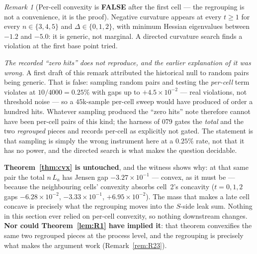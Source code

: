 \documentclass[11pt]{article}
\theoremstyle{definition}
\theoremstyle{remark}
\newtheorem{remark}{Remark}
\begin{document}
\begin{remark}[Per-cell convexity is \textbf{FALSE} after the first cell
--- the regrouping is not a convenience, it is the proof]
Negative curvature appears at every $t\ge1$ for every
$n\in\{3,4,5\}$ and $\Delta\in\{0,1,2\}$, with minimum Hessian eigenvalues
between $-1.2$ and $-5.0$: it is generic, not marginal. A directed
curvature search finds a violation at the first base point tried.

\emph{The recorded ``zero hits'' does not reproduce, and the earlier
explanation of it was wrong.} A first draft of this remark attributed the
historical null to random pairs being generic. That is false: sampling
random pairs and testing the \emph{per-cell} term violates at
$10/4000=0.25\%$ with gaps up to $+4.5\times10^{-2}$ --- real violations, not
threshold noise --- so a $45$k-sample per-cell sweep would have produced of
order a hundred hits. Whatever sampling produced the ``zero hits'' note
therefore cannot have been per-cell pairs of this kind; the harness of 079
gates the \emph{total} and the two \emph{regrouped} pieces and records
per-cell as explicitly not gated. The statement is that sampling is
simply the wrong instrument here at a $0.25\%$ rate, not that it has no
power, and the directed search is what makes the question decidable.

\textbf{Theorem~\ref{thm:cvx} is untouched}, and the witness shows why: at
that same pair the total $n\,L_a$ has Jensen gap $-3.27\times10^{-1}$
--- convex, as it must be --- because the neighbouring cells' convexity
absorbs cell~2's concavity ($t=0,1,2$ gaps
$-6.28\times10^{-2}$, $-3.33\times10^{-1}$, $+6.95\times10^{-2}$). The
mass that makes a late cell concave is precisely what the regrouping moves
into the $S$-side leak sum. Nothing in this section ever relied on per-cell
convexity, so nothing downstream changes. \textbf{Nor could
Theorem~\ref{lem:R1} have implied it}: that theorem convexifies the same two
regrouped pieces at the process level, and the regrouping is precisely
what makes the argument work (Remark~\ref{rem:R23}).
\end{remark}
\end{document}
